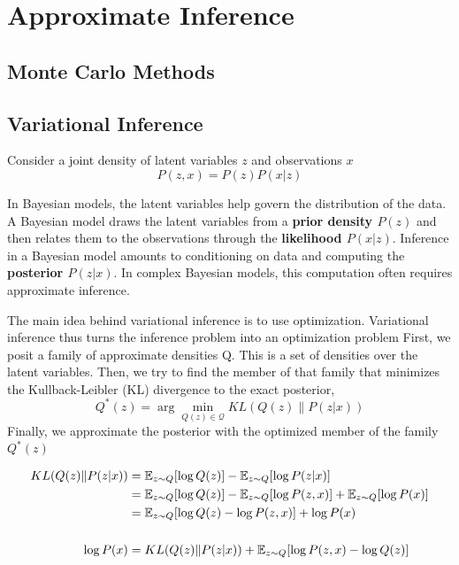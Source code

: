 \chapter{Approximate Inference}

\section{Monte Carlo Methods}

\section{Variational Inference}
Consider a joint density of latent variables $z$ and observations $x$
\begin{equation}
    P(z, x) = P(z)P(x|z)
\end{equation}

In Bayesian models, the latent variables help govern the distribution of the data. A Bayesian
model draws the latent variables from a \textbf{prior density $P(z)$} and then relates them to the
observations through the \textbf{likelihood $P(x|z)$}. Inference in a Bayesian model amounts to
conditioning on data and computing the \textbf{posterior $P(z|x)$}. In complex Bayesian models,
this computation often requires approximate inference.

The main idea behind variational inference is to use optimization. Variational inference thus turns the
inference problem into an optimization problem
First, we posit a family of approximate densities Q. This is a set of densities over the latent
variables. Then, we try to find the member of that family that minimizes the Kullback-Leibler
(KL) divergence to the exact posterior,
\begin{equation}
    Q^*(z) = \arg \min_{Q(z) \in \mathcal{Q}} KL(Q(z)\|P(z|x))
\end{equation}
Finally, we approximate the posterior with the optimized member of the family $Q^*(z)$

\begin{equation}
    \begin{split}
        KL(Q(z)\|P(z|x))
        &= \mathbb{E}_{z \sim Q} [\log Q(z)] - \mathbb{E}_{z \sim Q} [\log P(z|x)] \\
        &= \mathbb{E}_{z \sim Q} [\log Q(z)] - \mathbb{E}_{z \sim Q} [\log P(z, x)] + \mathbb{E}_{z \sim Q}[\log P(x)]\\
        &= \mathbb{E}_{z \sim Q} [\log Q(z) - \log P(z, x)] + \log P(x) \\
        \\
        \log P(x)
        &= KL(Q(z)\|P(z|x)) + \mathbb{E}_{z \sim Q} [\log P(z, x) - \log Q(z)]
    \end{split}
\end{equation}

